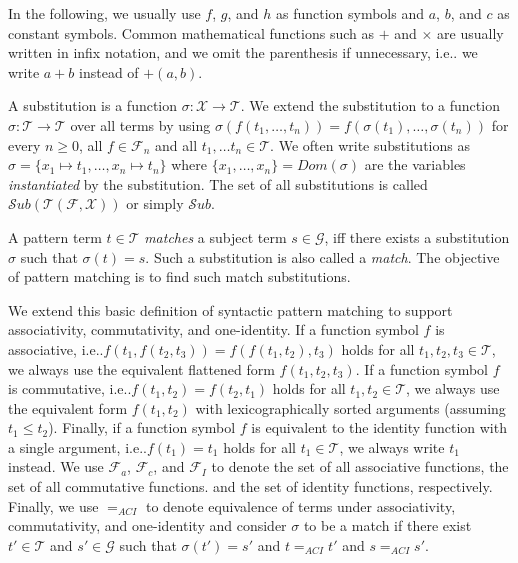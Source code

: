 \documentclass[conference,compsoc]{IEEEtran}
\makeatletter
\DeclareRobustCommand\onedot{\futurelet\@let@token\@onedot}
\def\@onedot{\ifx\@let@token.\else.\null\fi\xspace}
\def\eg{{e.g}\onedot} \def\Eg{{E.g}\onedot}
\def\ie{{i.e}\onedot} \def\Ie{{I.e}\onedot}
\newcommand{\termset}{\mathcal{T}}
\newcommand{\funcset}{\mathcal{F}}
\newcommand{\varset}{\mathcal{X}}
\newcommand{\groundset}{\mathcal{G}}
\newcommand{\substs}{\mathcal{S}ub}
\makeatother
\begin{document}
In the following, we usually use $f$, $g$, and $h$ as function symbols and $a$, $b$, and $c$ as
constant symbols.
Common mathematical functions such as $+$ and $\times$ are usually written in infix notation, and we omit the parenthesis if unnecessary, \ie we write $a + b$ instead of $+(a, b)$.

A substitution is a function $\sigma\colon \varset \rightarrow \termset$.
We extend the substitution to a function $\sigma\colon \termset \rightarrow \termset$ over all terms by using $\sigma(f(t_1, \dots, t_n)) = f(\sigma(t_1), \dots, \sigma(t_n))$ for every $n \geq 0$, all $f \in \funcset_n$ and all $t_1, \dots t_n \in \termset$.
We often write substitutions as $\sigma = \{ x_1 \mapsto t_1, \dots, x_n \mapsto t_n \}$ where $\{x_1, \dots, x_n\} = Dom(\sigma)$ are the variables \emph{instantiated} by the substitution.
The set of all substitutions is called $\substs(\termset(\funcset, \varset))$ or simply $\substs$.

A pattern term $t \in \termset$ \emph{matches} a subject term $s \in \groundset$, iff there exists a substitution $\sigma$ such that $\sigma(t) = s$.
Such a substitution is also called a \emph{match}.
The objective of pattern matching is to find such match substitutions.

We extend this basic definition of syntactic pattern matching to support associativity, commutativity, and one-identity.
If a function symbol $f$ is associative, \ie $f(t_1, f(t_2, t_3)) = f(f(t_1, t_2), t_3)$ holds for all $t_1, t_2, t_3 \in \termset$,
we always use the equivalent flattened form $f(t_1, t_2, t_3)$.
If a function symbol $f$ is commutative, \ie $f(t_1, t_2) = f(t_2, t_1)$ holds for all $t_1, t_2 \in \termset$,
we always use the equivalent form $f(t_1, t_2)$ with lexicographically sorted arguments (assuming $t_1 \leq t_2$).
Finally, if a function symbol $f$ is equivalent to the identity function with a single argument,
\ie $f(t_1) = t_1$ holds for all $t_1 \in \termset$, we always write $t_1$
instead.
We use $\funcset_a$, $\funcset_c$, and  $\funcset_I$ to denote
the set of all associative functions,
the set of all commutative functions.
and the set of identity functions, respectively.
Finally, we use $=_{ACI}$ to denote equivalence of terms under associativity, commutativity, and one-identity and consider $\sigma$ to be a match if there exist $t' \in \termset$ and $s' \in \groundset$ such that $\sigma(t') = s'$ and $t =_{ACI} t'$ and $s =_{ACI} s'$.
\end{document}
